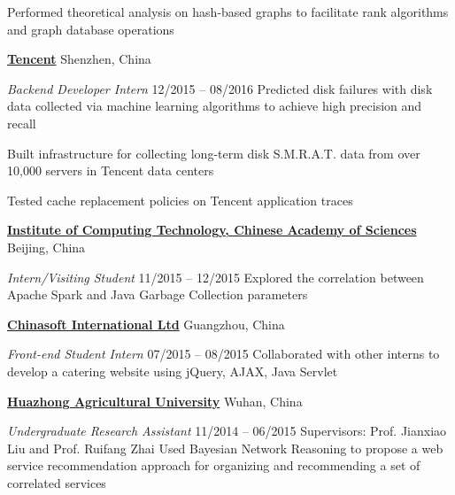 \documentclass[letterpaper,10pt,oneside]{article}
\begin{document}
\begin{body}
\GapNoBreak
\BulletItem
Performed theoretical analysis on hash-based graphs to facilitate rank algorithms and graph database operations


\BigGap
\href{https://www.tencent.com/en-us/index.html}
{\textbf{Tencent}} %
\hfill
Shenzhen, China

\emph{Backend Developer Intern}
\hfill
12/2015 --
08/2016
\GapNoBreak
\BulletItem
Predicted disk failures with disk data collected via machine learning algorithms to achieve high precision and recall

\GapNoBreak
\BulletItem
Built infrastructure for collecting long-term disk S.M.R.A.T. data from over 10,000 servers in Tencent data centers

\GapNoBreak
\BulletItem
Tested cache replacement policies on Tencent application traces

\BigGap
\href{http://english.ict.cas.cn/}
{\textbf{Institute of Computing Technology, Chinese Academy of Sciences}}
\hfill
Beijing, China

\emph{Intern/Visiting Student}
\hfill
11/2015 --
12/2015
\GapNoBreak
\BulletItem
Explored the correlation between Apache Spark and Java Garbage Collection parameters

\BigGap
\href{http://www.chinasofti.com/en/index.shtml}
{\textbf{Chinasoft International Ltd}}
\hfill
Guangzhou, China

\emph{Front-end Student Intern}
\hfill
07/2015 --
08/2015
\GapNoBreak
\BulletItem
Collaborated with other interns to develop a catering website using jQuery, AJAX, Java Servlet

\BigGap
\href{http://www.hzau.edu.cn/en/HOME.htm}
{\textbf{Huazhong Agricultural University}}
\hfill
Wuhan, China

\emph{Undergraduate Research Assistant}
\hfill
11/2014 --
06/2015
\GapNoBreak
Supervisors: Prof. Jianxiao Liu and Prof. Ruifang Zhai
\GapNoBreak
\BulletItem
Used Bayesian Network Reasoning to propose a web service recommendation approach for organizing and recommending a set of correlated services


\end{body}
\end{document}
